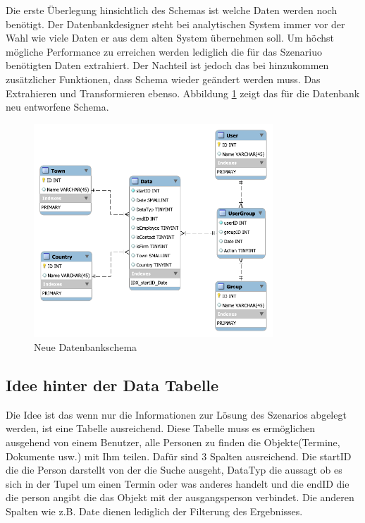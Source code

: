 Die erste Überlegung hinsichtlich des Schemas ist welche Daten werden noch benötigt. Der Datenbankdesigner steht bei analytischen System immer vor der Wahl wie viele Daten er aus dem alten System übernehmen soll. Um höchst mögliche Performance zu erreichen werden lediglich die für das Szenariuo benötigten Daten extrahiert. Der Nachteil ist jedoch das bei hinzukommen zusätzlicher Funktionen, dass Schema wieder geändert werden muss. Das Extrahieren und Transformieren ebenso. Abbildung \ref{konzept_SchemaNeu} zeigt das für die Datenbank neu entworfene Schema. 

\begin{figure}[htbp]
\centering
  \includegraphics[width=0.8\textwidth, width=0.8\textwidth]{pics/NewSchema.pdf}
\caption{Neue Datenbankschema}
\label{konzept_SchemaNeu}
\end{figure} 

\subsection{Idee hinter der Data Tabelle}

Die Idee ist das wenn nur die Informationen zur Lösung des Szenarios abgelegt werden, ist eine Tabelle ausreichend. Diese Tabelle muss es ermöglichen ausgehend von einem Benutzer, alle Personen zu finden die Objekte(Termine, Dokumente usw.) mit Ihm teilen. Dafür sind 3 Spalten ausreichend. Die startID die die Person darstellt von der die Suche ausgeht, DataTyp die aussagt ob es sich in der Tupel um einen Termin oder was anderes handelt und die endID die die person angibt die das Objekt mit der ausgangsperson verbindet. Die anderen Spalten wie z.B. Date dienen lediglich der Filterung des Ergebnisses.

